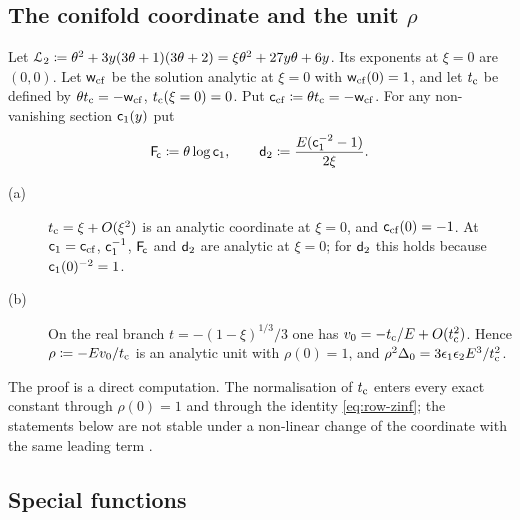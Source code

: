 \subsection{The conifold coordinate and the unit \texorpdfstring{$\rho$}{rho}}
\label{sec:set-coord}

Let $\mathcal{L}_{2}\coloneqq\theta^2+3y(3\theta+1)(3\theta+2)=\xi\theta^2+27y\theta+6y$. Its exponents at $\xi=0$ are $(0,0)$. Let $\mathsf{w}_{\mathrm{cf}}$ be the solution analytic at $\xi=0$ with $\mathsf{w}_{\mathrm{cf}}(0)=1$, and let $t_{\mathrm{c}}$ be defined by $\theta t_{\mathrm{c}}=-\mathsf{w}_{\mathrm{cf}}$, $t_{\mathrm{c}}(\xi=0)=0$. Put $\mathsf{c}_{\mathrm{cf}}\coloneqq\theta t_{\mathrm{c}}=-\mathsf{w}_{\mathrm{cf}}$. For any non-vanishing section $\mathsf{c}_{1}(y)$ put
\[
\mathsf{F}_{\!\mathsf{c}}\coloneqq\theta\log\mathsf{c}_{1},\qquad\mathsf{d}_{2}\coloneqq\frac{E(\mathsf{c}_{1}^{-2}-1)}{2\xi}.
\]

\begin{lem}[{\Lg{Lemma~2.2}}]
\label{lem:set-coord}
\begin{description}
\item[(a)] $t_{\mathrm{c}}=\xi+O(\xi^2)$ is an analytic coordinate at $\xi=0$, and $\mathsf{c}_{\mathrm{cf}}(0)=-1$. At $\mathsf{c}_{1}=\mathsf{c}_{\mathrm{cf}}$, $\mathsf{c}_{1}^{-1}$, $\mathsf{F}_{\!\mathsf{c}}$ and $\mathsf{d}_{2}$ are analytic at $\xi=0$; for $\mathsf{d}_{2}$ this holds because $\mathsf{c}_{1}(0)^{-2}=1$.
\item[(b)] On the real branch $t=-(1-\xi)^{1/3}/3$ one has $v_0=-t_{\mathrm{c}}/E+O(t_{\mathrm{c}}^2)$. Hence
$\rho\coloneqq-Ev_0/t_{\mathrm{c}}$
is an analytic unit with $\rho(0)=1$, and $\rho^2\Delta_0=3\epsilon_1\epsilon_2E^3/t_{\mathrm{c}}^2$.
\end{description}
\end{lem}

The proof is a direct computation. The normalisation of $t_{\mathrm{c}}$ enters every exact constant through $\rho(0)=1$ and through the identity \eqref{eq:row-zinf}; the statements below are not stable under a non-linear change of the coordinate with the same leading term .

\subsection{Special functions}
\label{sec:set-special}

